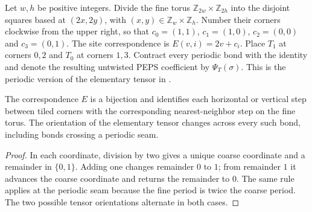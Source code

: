 \begin{definition}%
    \label{def:peps_kitaev_periodic_tiling}
    \leanok
    Let $w,h$ be positive integers. Divide the fine torus
    $\mathbb Z_{2w}\times\mathbb Z_{2h}$ into the disjoint squares
    based at $(2x,2y)$, with $(x,y)\in\mathbb Z_w\times\mathbb Z_h$.
    Number their corners clockwise from the upper right, so that
    $c_0=(1,1)$, $c_1=(1,0)$, $c_2=(0,0)$ and $c_3=(0,1)$.
    The site correspondence is $E(v,i)=2v+c_i$.
    Place $T_1$ at corners $0,2$ and $T_0$ at corners $1,3$.
    Contract every periodic bond with the identity and denote the resulting
    untwisted PEPS coefficient by $\Psi_T(\sigma)$.
    This is the periodic version of the elementary tensor in
    \cite[Section~7, ``Kitaev's code state'']{Schuch2010PEPS}.
\end{definition}

\begin{lemma}%
    \label{thm:peps_kitaev_periodic_tiling}
    \leanok
    The correspondence $E$ is a bijection and identifies each horizontal
    or vertical step between tiled corners with the corresponding
    nearest-neighbor step on the fine torus. The orientation of the
    elementary tensor changes across every such bond, including bonds
    crossing a periodic seam.
\end{lemma}

\begin{proof}\leanok
    In each coordinate, division by two gives a unique coarse coordinate
    and a remainder in $\{0,1\}$. Adding one changes remainder $0$ to $1$;
    from remainder $1$ it advances the coarse coordinate and returns the
    remainder to $0$. The same rule applies at the periodic seam because
    the fine period is twice the coarse period. The two possible tensor
    orientations alternate in both cases.
\end{proof}

